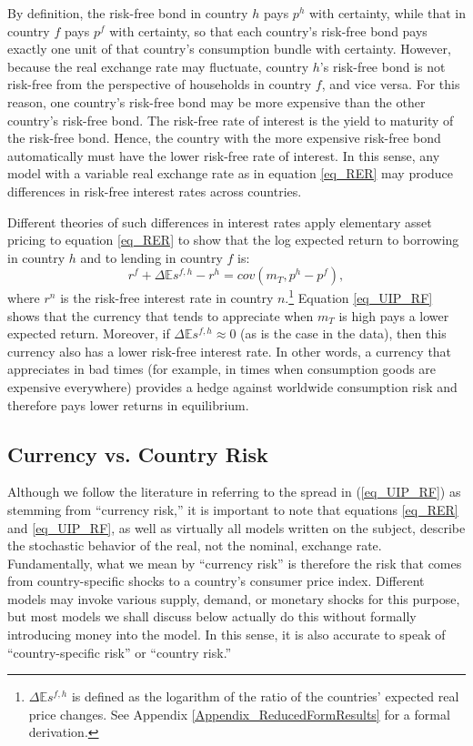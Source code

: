 \documentclass{ar-1col}
\begin{document}
By definition, the risk-free bond in country $h$ pays $p^h$ with certainty, while that in country $f$ pays $p^f$ with certainty, so that each country's risk-free bond pays exactly one unit of that country's consumption bundle with certainty. However, because the real exchange rate may fluctuate, country $h$'s risk-free bond is not risk-free from the perspective of households in country $f$, and vice versa. For this reason, one country's risk-free bond may be more expensive than the other country's risk-free bond. The risk-free rate of interest is the yield to maturity of the risk-free bond.  Hence, the country with the more expensive risk-free bond automatically must have the lower risk-free rate of interest. In this sense, any model with a variable real exchange rate as in equation \ref{eq_RER} may produce differences in risk-free interest rates across countries.

Different theories of such differences in interest rates apply elementary asset pricing to equation \ref{eq_RER} to show that the log expected return to borrowing in country $h$ and to lending in country $f$ is:
\begin{equation}
  r^{f} + \Delta \mathbb{E} s^{f,h} - r^{h} 
  = cov \left( m_{T}, p^{h}-p^{f}\right),
  \label{eq_UIP_RF}
\end{equation}%
where $r^{n}$ is the risk-free interest rate in country $n$.\footnote{$\Delta \mathbb{E} s^{f,h}$ is defined as the logarithm of the ratio of the countries' expected real price changes. See Appendix \ref{Appendix_ReducedFormResults} for a formal derivation.} Equation \ref{eq_UIP_RF} shows that the currency that tends to appreciate when $m_T$ is high pays a lower expected return. Moreover, if $\Delta \mathbb{E} s^{f,h}\approx0$ (as is the case in the data), then this currency also has a lower risk-free interest rate. In other words, a currency that appreciates in bad times (for example, in times when consumption goods are expensive everywhere) provides a hedge against worldwide consumption risk and therefore pays lower returns in equilibrium.

\begin{textbox}[]
\section{Currency vs. Country Risk}
Although we follow the literature in referring to the spread in (\ref{eq_UIP_RF}) as stemming from ``currency risk,'' it is important to note that equations \ref{eq_RER} and \ref{eq_UIP_RF}, as well as virtually all models written on the subject, describe the stochastic behavior of the real, not the nominal, exchange rate. Fundamentally, what we mean by ``currency risk'' is therefore the risk that comes from country-specific shocks to a country's consumer price index. Different models may invoke various supply, demand, or monetary shocks for this purpose, but most models we shall discuss below actually do this without formally introducing money into the model. In this sense, it is also accurate to speak of ``country-specific risk'' or ``country risk.'' 
\end{textbox}
\end{document}
